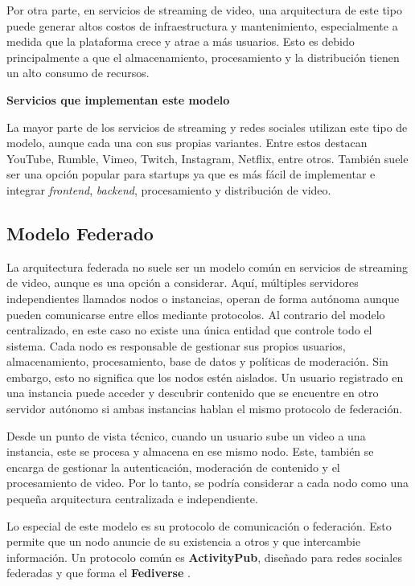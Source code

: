 Por otra parte, en servicios de streaming de video, una arquitectura de este tipo puede generar altos costos de infraestructura y mantenimiento, especialmente a medida que la plataforma crece y atrae a más usuarios. Esto es debido principalmente a que el almacenamiento, procesamiento y la distribución tienen un alto consumo de recursos. 

\textbf{Servicios que implementan este modelo}

La mayor parte de los servicios de streaming y redes sociales utilizan este tipo de modelo, aunque cada una con sus propias variantes. Entre estos destacan YouTube, Rumble, Vimeo, Twitch, Instagram, Netflix, entre otros. También suele ser una opción popular para startups ya que es más fácil de implementar e integrar \textit{frontend}, \textit{backend}, procesamiento y distribución de video. 

\pagebreak

\subsection{Modelo Federado}


La arquitectura federada no suele ser un modelo común en servicios de streaming de video, aunque es una opción a considerar. Aquí, múltiples servidores independientes llamados nodos o instancias, operan de forma autónoma aunque pueden comunicarse entre ellos mediante protocolos. Al contrario del modelo centralizado, en este caso no existe una única entidad que controle todo el sistema. Cada nodo es responsable de gestionar sus propios usuarios, almacenamiento, procesamiento, base de datos y políticas de moderación. Sin embargo, esto no significa que los nodos estén aislados. Un usuario registrado en una instancia puede acceder y descubrir contenido que se encuentre en otro servidor autónomo si ambas instancias hablan el mismo protocolo de federación.

Desde un punto de vista técnico, cuando un usuario sube un video a una instancia, este se procesa y almacena en ese mismo nodo. Este, también se encarga de gestionar la autenticación, moderación de contenido y el procesamiento de video. Por lo tanto, se podría considerar a cada nodo como una pequeña arquitectura centralizada e independiente. 

Lo especial de este modelo es su protocolo de comunicación o federación. Esto permite que un nodo anuncie de su existencia a otros y que intercambie información. Un protocolo común es \textbf{ActivityPub}, diseñado para redes sociales federadas y que forma el \textbf{Fediverse} \cite{activitypub}.


